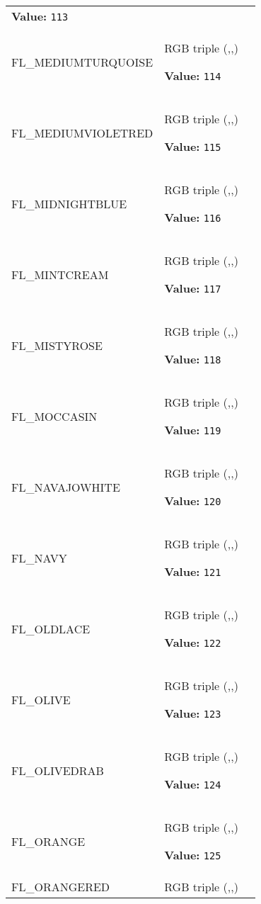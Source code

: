 \begin{longtable}{|p{\varnamewidth}|p{\vardescrwidth}|l}
\textbf{Value:} 
{\tt 113}&\\
\cline{1-2}
\raggedright F\-L\-\_\-M\-E\-D\-I\-U\-M\-T\-U\-R\-Q\-U\-O\-I\-S\-E\- & \raggedright RGB triple (,,)

\textbf{Value:} 
{\tt 114}&\\
\cline{1-2}
\raggedright F\-L\-\_\-M\-E\-D\-I\-U\-M\-V\-I\-O\-L\-E\-T\-R\-E\-D\- & \raggedright RGB triple (,,)

\textbf{Value:} 
{\tt 115}&\\
\cline{1-2}
\raggedright F\-L\-\_\-M\-I\-D\-N\-I\-G\-H\-T\-B\-L\-U\-E\- & \raggedright RGB triple (,,)

\textbf{Value:} 
{\tt 116}&\\
\cline{1-2}
\raggedright F\-L\-\_\-M\-I\-N\-T\-C\-R\-E\-A\-M\- & \raggedright RGB triple (,,)

\textbf{Value:} 
{\tt 117}&\\
\cline{1-2}
\raggedright F\-L\-\_\-M\-I\-S\-T\-Y\-R\-O\-S\-E\- & \raggedright RGB triple (,,)

\textbf{Value:} 
{\tt 118}&\\
\cline{1-2}
\raggedright F\-L\-\_\-M\-O\-C\-C\-A\-S\-I\-N\- & \raggedright RGB triple (,,)

\textbf{Value:} 
{\tt 119}&\\
\cline{1-2}
\raggedright F\-L\-\_\-N\-A\-V\-A\-J\-O\-W\-H\-I\-T\-E\- & \raggedright RGB triple (,,)

\textbf{Value:} 
{\tt 120}&\\
\cline{1-2}
\raggedright F\-L\-\_\-N\-A\-V\-Y\- & \raggedright RGB triple (,,)

\textbf{Value:} 
{\tt 121}&\\
\cline{1-2}
\raggedright F\-L\-\_\-O\-L\-D\-L\-A\-C\-E\- & \raggedright RGB triple (,,)

\textbf{Value:} 
{\tt 122}&\\
\cline{1-2}
\raggedright F\-L\-\_\-O\-L\-I\-V\-E\- & \raggedright RGB triple (,,)

\textbf{Value:} 
{\tt 123}&\\
\cline{1-2}
\raggedright F\-L\-\_\-O\-L\-I\-V\-E\-D\-R\-A\-B\- & \raggedright RGB triple (,,)

\textbf{Value:} 
{\tt 124}&\\
\cline{1-2}
\raggedright F\-L\-\_\-O\-R\-A\-N\-G\-E\- & \raggedright RGB triple (,,)

\textbf{Value:} 
{\tt 125}&\\
\cline{1-2}
\raggedright F\-L\-\_\-O\-R\-A\-N\-G\-E\-R\-E\-D\- & \raggedright RGB triple (,,)


\end{longtable}
